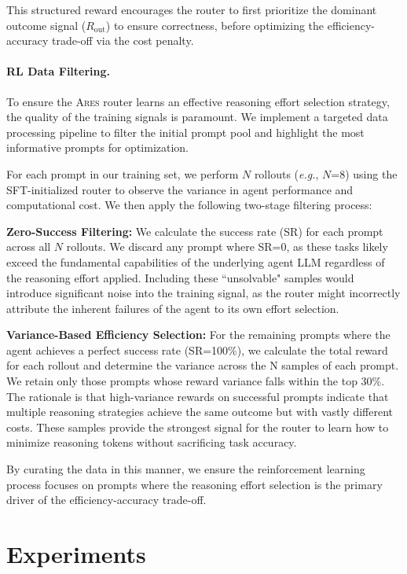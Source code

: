 \documentclass{article}
\theoremstyle{plain}
\theoremstyle{definition}
\theoremstyle{remark}
\begin{document}
This structured reward encourages the router to first prioritize the dominant outcome signal ($R_{\text{out}}$) to ensure correctness, before optimizing the efficiency-accuracy trade-off via the cost penalty.

\paragraph{RL Data Filtering.}
To ensure the \textsc{Ares} router learns an effective reasoning effort selection strategy, the quality of the training signals is paramount. We implement a targeted data processing pipeline to filter the initial prompt pool and highlight the most informative prompts for optimization.

For each prompt in our training set, we perform $N$ rollouts (\emph{e.g.}, $N$=8) using the SFT-initialized router to observe the variance in agent performance and computational cost. We then apply the following two-stage filtering process:

 \textbf{Zero-Success Filtering:} We calculate the success rate (SR) for each prompt across all $N$ rollouts. We discard any prompt where SR=0, as these tasks likely exceed the fundamental capabilities of the underlying agent LLM regardless of the reasoning effort applied. Including these ``unsolvable" samples would introduce significant noise into the training signal, as the router might incorrectly attribute the inherent failures of the agent to its own effort selection.


 \textbf{Variance-Based Efficiency Selection:} For the remaining prompts where the agent achieves a perfect success rate (SR=100\%), we calculate the total reward for each rollout and determine the variance across the N samples of each prompt. We retain only those prompts whose reward variance falls within the top 30\%. The rationale is that high-variance rewards on successful prompts indicate that multiple reasoning strategies achieve the same outcome but with vastly different costs. These samples provide the strongest signal for the router to learn how to minimize reasoning tokens without sacrificing task accuracy.

By curating the data in this manner, we ensure the reinforcement learning process focuses on prompts where the reasoning effort selection is the primary driver of the efficiency-accuracy trade-off.

\section{Experiments}
\label{sec:exp}
\end{document}
